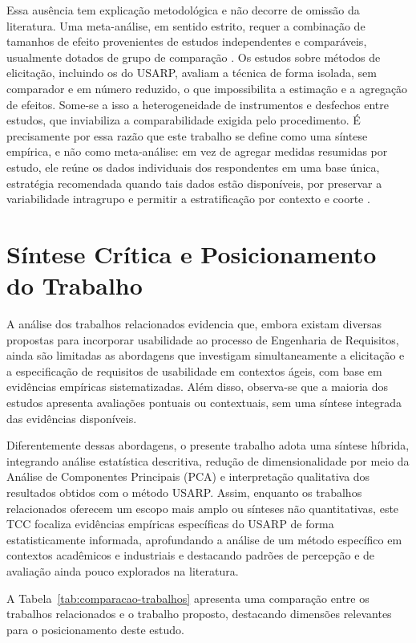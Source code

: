 Essa ausência tem explicação metodológica e não decorre de omissão da literatura. Uma meta-análise, em sentido estrito, requer a combinação de tamanhos de efeito provenientes de estudos independentes e comparáveis, usualmente dotados de grupo de comparação \cite{kitchenham2009}. Os estudos sobre métodos de elicitação, incluindo os do USARP, avaliam a técnica de forma isolada, sem comparador e em número reduzido, o que impossibilita a estimação e a agregação de efeitos. Some-se a isso a heterogeneidade de instrumentos e desfechos entre estudos, que inviabiliza a comparabilidade exigida pelo procedimento. É precisamente por essa razão que este trabalho se define como uma síntese empírica, e não como meta-análise: em vez de agregar medidas resumidas por estudo, ele reúne os dados individuais dos respondentes em uma base única, estratégia recomendada quando tais dados estão disponíveis, por preservar a variabilidade intragrupo e permitir a estratificação por contexto e coorte \cite{cruzesdyba2010,hair2019}.

\section{Síntese Crítica e Posicionamento do Trabalho}

A análise dos trabalhos relacionados evidencia que, embora existam diversas propostas para incorporar usabilidade ao processo de Engenharia de Requisitos, ainda são limitadas as abordagens que investigam simultaneamente a elicitação e a especificação de requisitos de usabilidade em contextos ágeis, com base em evidências empíricas sistematizadas. Além disso, observa-se que a maioria dos estudos apresenta avaliações pontuais ou contextuais, sem uma síntese integrada das evidências disponíveis.

Diferentemente dessas abordagens, o presente trabalho adota uma síntese híbrida, integrando análise estatística descritiva, redução de dimensionalidade por meio da Análise de Componentes Principais (PCA) e interpretação qualitativa dos resultados obtidos com o método USARP. Assim, enquanto os trabalhos relacionados oferecem um escopo mais amplo ou sínteses não quantitativas, este TCC focaliza evidências empíricas específicas do USARP de forma estatisticamente informada, aprofundando a análise de um método específico em contextos acadêmicos e industriais e destacando padrões de percepção e de avaliação ainda pouco explorados na literatura.

A Tabela~\ref{tab:comparacao-trabalhos} apresenta uma comparação entre os trabalhos relacionados e o trabalho proposto, destacando dimensões relevantes para o posicionamento deste estudo.

